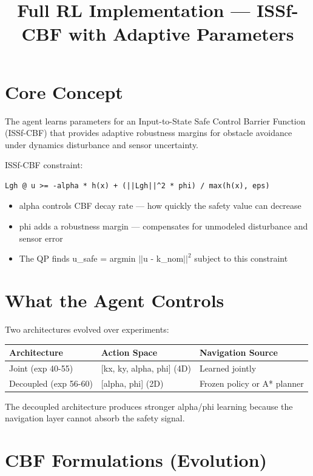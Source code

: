 \documentclass[11pt]{article}
\title{Full RL Implementation --- ISSf-CBF with Adaptive Parameters}
\author{}
\date{}
\begin{document}
\maketitle

\section*{Core Concept}

The agent learns parameters for an Input-to-State Safe Control Barrier Function (ISSf-CBF) that provides adaptive robustness margins for obstacle avoidance under dynamics disturbance and sensor uncertainty.

ISSf-CBF constraint:

\begin{verbatim}
Lgh @ u >= -alpha * h(x) + (||Lgh||^2 * phi) / max(h(x), eps)
\end{verbatim}

\begin{itemize}
\item alpha controls CBF decay rate --- how quickly the safety value can decrease
\item phi adds a robustness margin --- compensates for unmodeled disturbance and sensor error
\item The QP finds u\_safe = argmin $||$u - k\_nom$||^2$ subject to this constraint
\end{itemize}


\section*{What the Agent Controls}

Two architectures evolved over experiments:

\begin{tabular}{lll}
\toprule
Architecture & Action Space & Navigation Source \\
\midrule
Joint (exp 40-55) & [kx, ky, alpha, phi] (4D) & Learned jointly \\
Decoupled (exp 56-60) & [alpha, phi] (2D) & Frozen policy or A* planner \\
\bottomrule
\end{tabular}

\vspace{1em}
The decoupled architecture produces stronger alpha/phi learning because the navigation layer cannot absorb the safety signal.


\section*{CBF Formulations (Evolution)}
\end{document}
